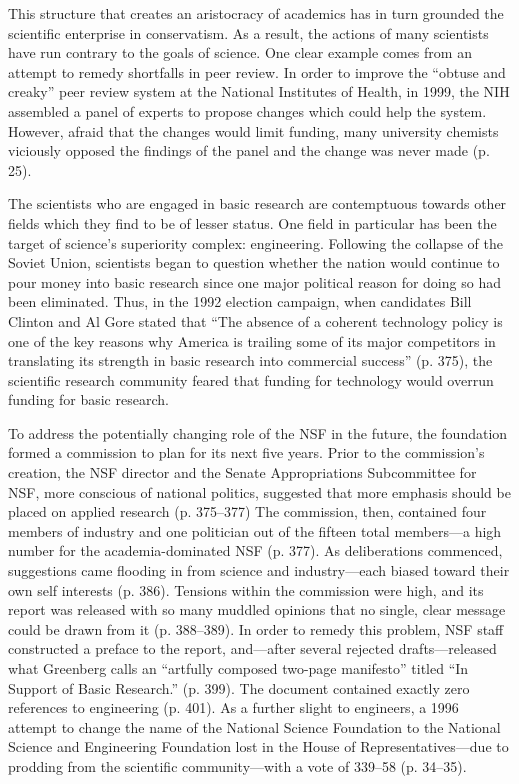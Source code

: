 \documentclass{article}[12pt]
\begin{document}
This structure that creates an aristocracy of academics has in turn grounded
the scientific enterprise in conservatism. As a result, the actions of many
scientists have run contrary to the goals of science. One clear example comes
from an attempt to remedy shortfalls in peer review. In order to improve the
``obtuse and creaky'' peer review system at the National Institutes of Health,
in 1999, the NIH assembled a panel of experts to propose changes which could
help the system. However, afraid that the changes would limit funding, many
university chemists viciously opposed the findings of the panel and the change
was never made (p. 25).

The scientists who are engaged in basic research are contemptuous towards other
fields which they find to be of lesser status. One field in particular has been
the target of science's superiority complex: engineering. Following the
collapse of the Soviet Union, scientists began to question whether the nation
would continue to pour money into basic research since one major political
reason for doing so had been eliminated. Thus, in the 1992 election campaign,
when candidates Bill Clinton and Al Gore stated that ``The absence of a
coherent technology policy is one of the key reasons why America is trailing
some of its major competitors in translating its strength in basic research
into commercial success'' (p. 375), the scientific research community
feared that funding for technology would overrun funding for basic research. 

To address the potentially changing role of the NSF in the future,
the foundation formed a commission to plan for its next five years. Prior to
the commission's creation, the NSF director and the Senate Appropriations
Subcommittee for NSF, more conscious of national politics, suggested that more
emphasis should be placed on applied research (p. 375--377) The
commission, then, contained four members of industry and one politician out of
the fifteen total members---a high number for the academia-dominated
NSF (p. 377). As deliberations commenced, suggestions came flooding in
from science and industry---each biased toward their own self
interests (p. 386). Tensions within the commission were high, and its
report was released with so many muddled opinions that no single, clear message
could be drawn from it (p. 388--389). In order to remedy this problem,
NSF staff constructed a preface to the report, and---after several rejected
drafts---released what Greenberg calls an ``artfully composed two-page
manifesto'' titled ``In Support of Basic Research.'' (p. 399). The
document contained exactly zero references to engineering (p. 401). As a
further slight to engineers, a 1996 attempt to change the name of the National
Science Foundation to the National Science and Engineering Foundation lost in
the House of Representatives---due to prodding from the scientific
community---with a vote of 339--58 (p. 34--35).
\end{document}
